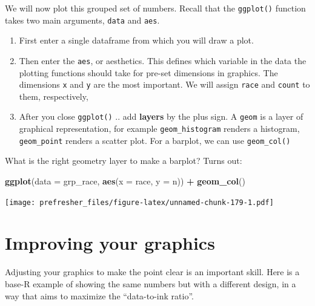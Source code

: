 \documentclass[]{book}
\newenvironment{Shaded}{\begin{snugshade}}{\end{snugshade}}
\newcommand{\KeywordTok}[1]{\textcolor[rgb]{0.13,0.29,0.53}{\textbf{#1}}}
\newcommand{\DataTypeTok}[1]{\textcolor[rgb]{0.13,0.29,0.53}{#1}}
\newcommand{\StringTok}[1]{\textcolor[rgb]{0.31,0.60,0.02}{#1}}
\newcommand{\OperatorTok}[1]{\textcolor[rgb]{0.81,0.36,0.00}{\textbf{#1}}}
\newcommand{\NormalTok}[1]{#1}
\providecommand{\tightlist}{%
  \setlength{\itemsep}{0pt}\setlength{\parskip}{0pt}}
\theoremstyle{definition}
\theoremstyle{definition}
\theoremstyle{definition}
\theoremstyle{remark}
\begin{document}
We will now plot this grouped set of numbers. Recall that the
\texttt{ggplot()} function takes two main arguments, \texttt{data} and
\texttt{aes}.

\begin{enumerate}
\def\labelenumi{\arabic{enumi}.}
\tightlist
\item
  First enter a single dataframe from which you will draw a plot.
\item
  Then enter the \texttt{aes}, or aesthetics. This defines which
  variable in the data the plotting functions should take for pre-set
  dimensions in graphics. The dimensions \texttt{x} and \texttt{y} are
  the most important. We will assign \texttt{race} and \texttt{count} to
  them, respectively,
\item
  After you close \texttt{ggplot()} .. add \textbf{layers} by the plus
  sign. A \texttt{geom} is a layer of graphical representation, for
  example \texttt{geom\_histogram} renders a histogram,
  \texttt{geom\_point} renders a scatter plot. For a barplot, we can use
  \texttt{geom\_col()}
\end{enumerate}

What is the right geometry layer to make a barplot? Turns out:

\begin{Shaded}
\begin{Highlighting}[]
\KeywordTok{ggplot}\NormalTok{(}\DataTypeTok{data =}\NormalTok{ grp_race, }\KeywordTok{aes}\NormalTok{(}\DataTypeTok{x =}\NormalTok{ race, }\DataTypeTok{y =}\NormalTok{ n)) }\OperatorTok{+}\StringTok{ }\KeywordTok{geom_col}\NormalTok{()}
\end{Highlighting}
\end{Shaded}

\texttt{[image: prefresher\_files/figure-latex/unnamed-chunk-179-1.pdf]}

\section{Improving your graphics}\label{improving-your-graphics}

Adjusting your graphics to make the point clear is an important skill.
Here is a base-R example of showing the same numbers but with a
different design, in a way that aims to maximize the ``data-to-ink
ratio''.
\end{document}
